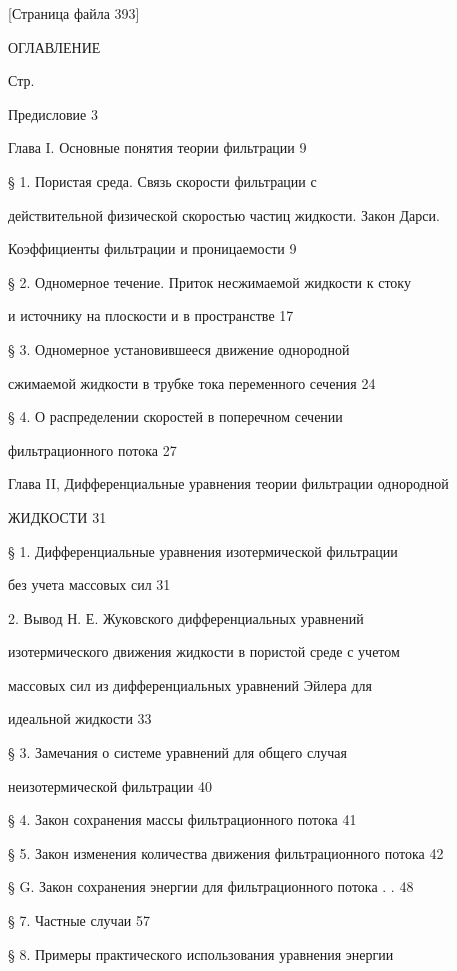 \documentclass[
  11pt,
]{article}
\begin{document}
\begingroup\small\setlength{\parindent}{0pt}\setlength{\parskip}{1pt}
{[}Страница файла 393{]}\par
ОГЛАВЛЕНИЕ \par
Стр. \par
Предисловие 3 \par
Глава I. Основные понятия теории фильтрации 9 \par
§ 1. Пористая среда. Связь скорости фильтрации с  \par
действительной физической скоростью частиц жидкости. Закон Дарси. \par
Коэффициенты фильтрации и проницаемости 9 \par
§ 2. Одномерное течение. Приток несжимаемой жидкости к стоку \par
и источнику на плоскости и в пространстве 17 \par
§ 3. Одномерное установившееся движение однородной  \par
сжимаемой жидкости в трубке тока переменного сечения 24 \par
§ 4. О распределении скоростей в поперечном сечении  \par
фильтрационного потока 27 \par
Глава II, Дифференциальные уравнения теории фильтрации однородной \par
ЖИДКОСТИ 31 \par
§ 1. Дифференциальные уравнения изотермической фильтрации \par
без учета массовых сил 31 \par
\textbar{} 2. Вывод Н. Е. Жуковского дифференциальных уравнений  \par
изотермического движения жидкости в пористой среде с учетом \par
массовых сил из дифференциальных уравнений Эйлера для \par
идеальной жидкости 33 \par
§ 3. Замечания о системе уравнений для общего случая  \par
неизотермической фильтрации 40 \par
§ 4. Закон сохранения массы фильтрационного потока 41 \par
§ 5. Закон изменения количества движения фильтрационного потока 42 \par
§ G. Закон сохранения энергии для фильтрационного потока . . 48 \par
§ 7. Частные случаи 57 \par
§ 8. Примеры практического использования уравнения энергии \par
\end{document}
